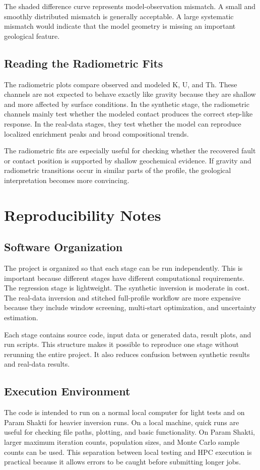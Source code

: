 \documentclass[12pt,a4paper]{article}
\begin{document}
The shaded difference curve represents model-observation mismatch. A small and smoothly distributed mismatch is generally acceptable. A large systematic mismatch would indicate that the model geometry is missing an important geological feature.

\subsection{Reading the Radiometric Fits}
The radiometric plots compare observed and modeled K, U, and Th. These channels are not expected to behave exactly like gravity because they are shallow and more affected by surface conditions. In the synthetic stage, the radiometric channels mainly test whether the modeled contact produces the correct step-like response. In the real-data stages, they test whether the model can reproduce localized enrichment peaks and broad compositional trends.

The radiometric fits are especially useful for checking whether the recovered fault or contact position is supported by shallow geochemical evidence. If gravity and radiometric transitions occur in similar parts of the profile, the geological interpretation becomes more convincing.

\section{Reproducibility Notes}
\subsection{Software Organization}
The project is organized so that each stage can be run independently. This is important because different stages have different computational requirements. The regression stage is lightweight. The synthetic inversion is moderate in cost. The real-data inversion and stitched full-profile workflow are more expensive because they include window screening, multi-start optimization, and uncertainty estimation.

Each stage contains source code, input data or generated data, result plots, and run scripts. This structure makes it possible to reproduce one stage without rerunning the entire project. It also reduces confusion between synthetic results and real-data results.

\subsection{Execution Environment}
The code is intended to run on a normal local computer for light tests and on Param Shakti for heavier inversion runs. On a local machine, quick runs are useful for checking file paths, plotting, and basic functionality. On Param Shakti, larger maximum iteration counts, population sizes, and Monte Carlo sample counts can be used. This separation between local testing and HPC execution is practical because it allows errors to be caught before submitting longer jobs.
\end{document}
